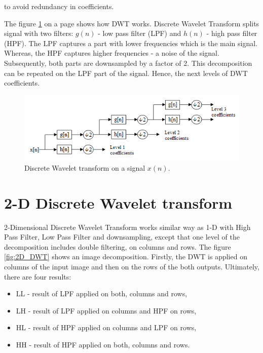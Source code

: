 to avoid redundancy in coefficients.


The figure \ref{fig:DWT} on a page \pageref{fig:DWT} shows how DWT works. Discrete Wavelet Transform splits signal with two filters: $g(n)$ - low pass filter (LPF) and $h(n)$ - high pass filter (HPF). The LPF captures a part with lower frequencies which is the main signal. Whereas, the HPF captures higher frequencies - a noise of the signal. Subsequently, both parts are downsampled by a factor of 2. This decomposition can be repeated on the LPF part of the signal. Hence, the next levels of DWT coefficients.

\begin{figure}[h]
	\centering
	\includegraphics[width=\textwidth]{DWT.png}
	\caption{Discrete Wavelet transform on a signal $x(n)$.}
	\label{fig:DWT}
\end{figure}


\section{2-D Discrete Wavelet transform}
\label{sec:2D_DWT}

2-Dimensional Discrete Wavelet Transform works similar way as 1-D with High Pass Filter, Low Pass Filter and downsampling, except that one level of the decomposition includes double filtering, on columns and rows. The figure \ref{fig:2D_DWT} shows an image decomposition. Firstly, the DWT is applied on columns of the input image and then on the rows of the both outputs. Ultimately, there are four results:

\begin{itemize}
\item LL - result of LPF applied on both, columns and rows,
\item LH - result of LPF applied on columns and HPF on rows,
\item HL - result of HPF applied on columns and LPF on rows,
\item HH - result of HPF applied on both, columns and rows.
\end{itemize}  

